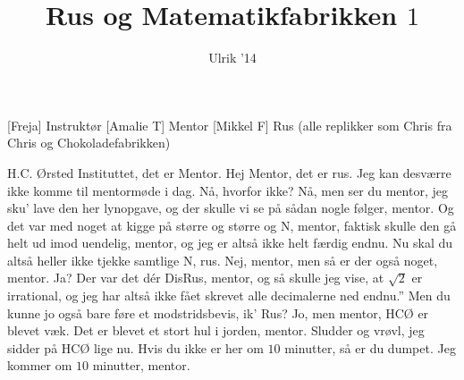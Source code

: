 \documentclass[a4paper,11pt]{article}
\title{Rus og Matematikfabrikken $1$}
\author{Ulrik '14}
\begin{document}
\maketitle

\begin{roles}
[Freja] Instruktør
[Amalie T] Mentor
[Mikkel F] Rus (alle replikker som Chris fra Chris og Chokoladefabrikken)
\end{roles}

\begin{props}
\end{props}

\begin{sketch}



 H.C. Ørsted Instituttet, det er Mentor.
 Hej Mentor, det er rus. Jeg kan desværre ikke komme til mentormøde i dag.
 Nå, hvorfor ikke?
 Nå, men ser du mentor, jeg sku' lave den her lynopgave, og der skulle vi se på sådan nogle følger, mentor. Og det var med noget at kigge på større og større og N, mentor, faktisk skulle den gå helt ud imod uendelig, mentor, og jeg er altså ikke helt færdig endnu.
 Nu skal du altså heller ikke tjekke samtlige N, rus.
 Nej, mentor, men så er der også noget, mentor.
 Ja?
 Der var det dér DisRus, mentor, og så skulle jeg vise, at $\sqrt{2}$ er irrational, og jeg har altså ikke fået skrevet alle decimalerne ned endnu.”
 Men du kunne jo også bare føre et modstridsbevis, ik' Rus?
 Jo, men mentor, HCØ er blevet væk. Det er blevet et stort hul i jorden, mentor.
 Sludder og vrøvl, jeg sidder på HCØ lige nu. Hvis du ikke er her om $10$ minutter, så er du dumpet.
 Jeg kommer om $10$ minutter, mentor.




\end{sketch}
\end{document}

